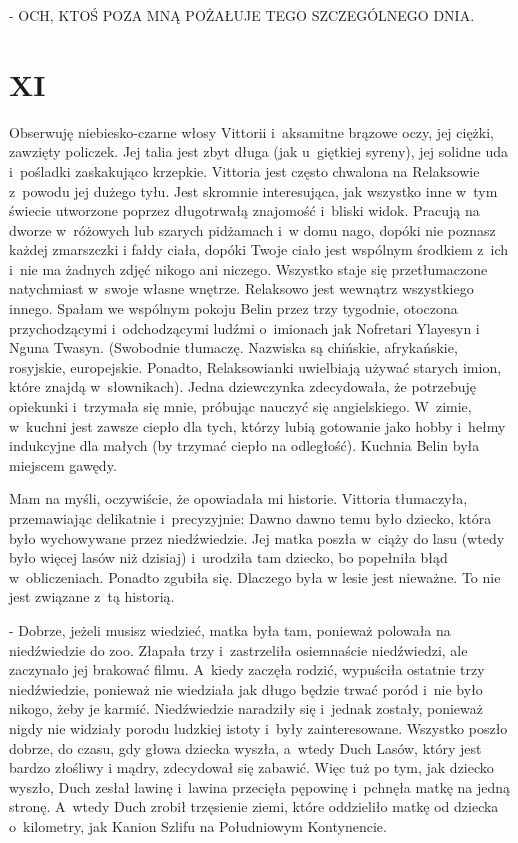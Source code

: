 \documentclass[oneside,polish,12pt,sfheadings]{mwbk}
\begin{document}
- OCH, KTOŚ POZA MNĄ POŻAŁUJE TEGO SZCZEGÓLNEGO DNIA.

\chapter{XI}

Obserwuję niebiesko-czarne włosy Vittorii i~aksamitne brązowe oczy,
jej ciężki, zawzięty policzek. Jej talia jest zbyt długa (jak u~giętkiej
syreny), jej solidne uda i~pośladki zaskakująco krzepkie. Vittoria
jest często chwalona na Relaksowie z~powodu jej dużego tyłu. Jest
skromnie interesująca, jak wszystko inne w~tym świecie utworzone poprzez
długotrwałą znajomość i~bliski widok. Pracują na dworze w~różowych
lub szarych pidżamach i~w domu nago, dopóki nie poznasz każdej zmarszczki
i fałdy ciała, dopóki Twoje ciało jest wspólnym środkiem z~ich i~nie
ma żadnych zdjęć nikogo ani niczego. Wszystko staje się przetłumaczone
natychmiast w~swoje własne wnętrze. Relaksowo jest wewnątrz wszystkiego
innego. Spałam we wspólnym pokoju Belin przez trzy tygodnie, otoczona
przychodzącymi i~odchodzącymi ludźmi o~imionach jak Nofretari Ylayesyn
i Nguna Twasyn. (Swobodnie tłumaczę. Nazwiska są chińskie, afrykańskie,
rosyjskie, europejskie. Ponadto, Relaksowianki uwielbiają używać starych
imion, które znajdą w~słownikach). Jedna dziewczynka zdecydowała,
że potrzebuję opiekunki i~trzymała się mnie, próbując nauczyć się
angielskiego. W~zimie, w~kuchni jest zawsze ciepło dla tych, którzy
lubią gotowanie jako hobby i~hełmy indukcyjne dla małych (by trzymać
ciepło na odległość). Kuchnia Belin była miejscem gawędy.

Mam na myśli, oczywiście, że opowiadała mi historie. Vittoria tłumaczyła,
przemawiając delikatnie i~precyzyjnie: Dawno dawno temu było dziecko,
która było wychowywane przez niedźwiedzie. Jej matka poszła w~ciąży
do lasu (wtedy było więcej lasów niż dzisiaj) i~urodziła tam dziecko,
bo popełniła błąd w~obliczeniach. Ponadto zgubiła się. Dlaczego była
w lesie jest nieważne. To nie jest związane z~tą historią.

- Dobrze, jeżeli musisz wiedzieć, matka była tam, ponieważ polowała
na niedźwiedzie do zoo. Złapała trzy i~zastrzeliła osiemnaście niedźwiedzi,
ale zaczynało jej brakować filmu. A~kiedy zaczęła rodzić, wypuściła
ostatnie trzy niedźwiedzie, ponieważ nie wiedziała jak długo będzie
trwać poród i~nie było nikogo, żeby je karmić. Niedźwiedzie naradziły
się i~jednak zostały, ponieważ nigdy nie widziały porodu ludzkiej
istoty i~były zainteresowane. Wszystko poszło dobrze, do czasu, gdy
głowa dziecka wyszła, a~wtedy Duch Lasów, który jest bardzo złośliwy
i mądry, zdecydował się zabawić. Więc tuż po tym, jak dziecko wyszło,
Duch zesłał lawinę i~lawina przecięła pępowinę i~pchnęła matkę na
jedną stronę. A~wtedy Duch zrobił trzęsienie ziemi, które oddzieliło
matkę od dziecka o~kilometry, jak Kanion Szlifu na Południowym Kontynencie.
\end{document}
